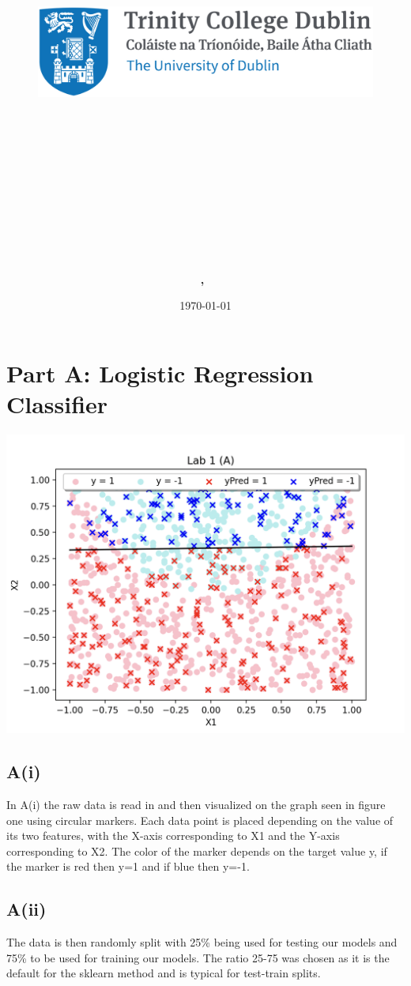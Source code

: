 \documentclass{article}
\title{
\vspace{-1in}
\begin{figure}[!ht]
\flushleft
\includegraphics[width=0.4\linewidth]{reduced-trinity.png}
\end{figure}
\vspace{-0.5cm}
\hrulefill \\
\vspace{0.5cm}
\textmd{\textbf{\moduleCode\ \moduleName}}\\
\textmd{\textbf{\assignmentTitle}}\\
\vspace{0.5cm}
\hrulefill \\
}
\author{\textbf{\authorName,\ \authorID}}
\date{\today}
\begin{document}
\captionsetup{width=.8\linewidth} 

\maketitle


\section{Part A: Logistic Regression Classifier}
\includegraphics[width=\linewidth]{pA.png}

\subsection{A(i)}
In A(i) the raw data is read in and then visualized on the graph seen in figure one using circular markers. Each data point is placed depending on the value of its two features, with the X-axis corresponding to X1 and the Y-axis corresponding to X2. The color of the marker depends on the target value y, if the marker is red then y=1 and if blue then y=-1.

\subsection{A(ii)}
The data is then randomly split with 25\% being used for testing our models and 75\% to be used for training our models. The ratio 25-75 was chosen as it is the default for the sklearn method and is typical for test-train splits.
\end{document}
